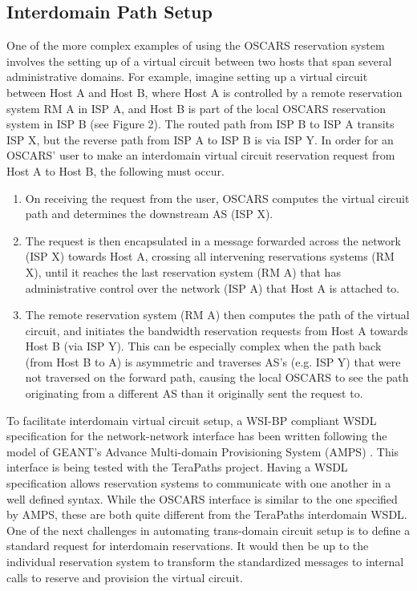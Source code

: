 \documentclass[conference]{IEEEtran}
\begin{document}
\subsection{Interdomain Path Setup }
One of the more complex examples of using the OSCARS reservation system
involves the setting up of a virtual circuit between two hosts that span
several administrative domains.  For example, imagine setting up a
virtual circuit between Host A and Host B, where Host A is controlled by a
remote reservation system RM A in ISP A, and Host B is part of the local
OSCARS reservation system in ISP B (see Figure 2). The routed path from ISP B
to ISP A transits ISP X, but the reverse path from ISP A to ISP B is via ISP Y.
In order for an OSCARS' user to make an interdomain virtual circuit reservation
request from Host A to Host B, the following must occur.
\begin{enumerate}
\item 
On receiving the request from the user, OSCARS
computes the virtual circuit path and determines the downstream AS (ISP X).
\item
The request is then encapsulated in a message forwarded across the network 
(ISP X) towards Host
A, crossing all intervening reservations systems (RM X), until it reaches the
last reservation system (RM A) that has administrative control over the network
(ISP A) that Host A is attached to.
\item
The remote reservation system (RM A) then computes the path of the virtual
circuit, and initiates the bandwidth reservation requests from Host A towards
Host B (via ISP Y).  This can be especially complex when the path back (from
Host B to A) is asymmetric and traverses AS's (e.g. ISP Y) that were not
traversed on the forward path, causing the local OSCARS to see the path
originating from a different AS than it originally sent the request to.

\end{enumerate}


To facilitate interdomain virtual circuit setup, a WSI-BP \cite{ballinger}
compliant WSDL specification for the 
network-network interface has been written following the model of 
GEANT's Advance Multi-domain Provisioning
System (AMPS)  \cite{GEANT-AMPS} . This interface is being tested with the 
TeraPaths \cite{TeraPaths} project. 
Having a WSDL specification allows reservation systems to communicate with one 
another in a well defined 
syntax. While the OSCARS interface is similar to the one specified by AMPS, these
are both quite different from the TeraPaths interdomain WSDL.
One of the next challenges in
automating trans-domain circuit setup is to define a standard request for interdomain
reservations. It would then be up to the individual reservation system to 
transform the standardized messages to internal calls to reserve and provision the 
virtual circuit.
\end{document}
